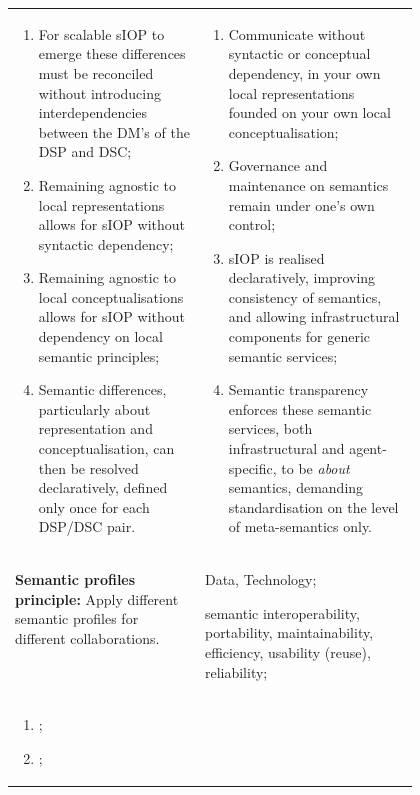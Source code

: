 \begin{xltabular}[l]{\linewidth}{@{} >{\small\raggedright\arraybackslash}p{0.47\linewidth} >{\small\raggedright\arraybackslash}X @{}}
\begin{enumerate}[left=6pt, nosep]
  \item For scalable sIOP to emerge these differences must be reconciled without introducing interdependencies between the DM's of the DSP and DSC;
  \item Remaining agnostic to local representations allows for sIOP without syntactic dependency;
  \item Remaining agnostic to local conceptualisations allows for sIOP without dependency on local semantic principles;
  \item Semantic differences, particularly about representation and conceptualisation, can then be resolved declaratively, defined only once for each DSP/DSC pair.
\end{enumerate}
&
\begin{enumerate}[left=10pt, nosep]
  \item Communicate without syntactic or conceptual dependency, in your own local representations founded on your own local conceptualisation;
  \item Governance and maintenance on semantics remain under one's own control;
  \item sIOP is realised declaratively, improving consistency of semantics, and allowing infrastructural components for generic semantic services;
  \item Semantic transparency enforces these semantic services, both infrastructural and agent-specific, to be \emph{about} semantics, demanding standardisation on the level of meta-semantics only.
\end{enumerate} \\
%
%
%
\begin{mmdp}\label{dp:sprof}{\bfseries Semantic profiles principle:}
\quad Apply different semantic profiles for different collaborations. \end{mmdp}
&
\begin{description}[labelwidth=3.7cm,leftmargin=3.7cm+1ex,nosep,topsep=2ex,labelsep=1ex,font=\bfseries]
\item[Type of information:] Data, Technology;
\item[Quality attributes:] semantic interoperability, portability, maintainability, efficiency, usability (reuse), reliability;
\end{description}
\\
\begin{enumerate}[left=6pt, nosep]
  \item ;
  \item ;

\end{enumerate}
\end{xltabular}
